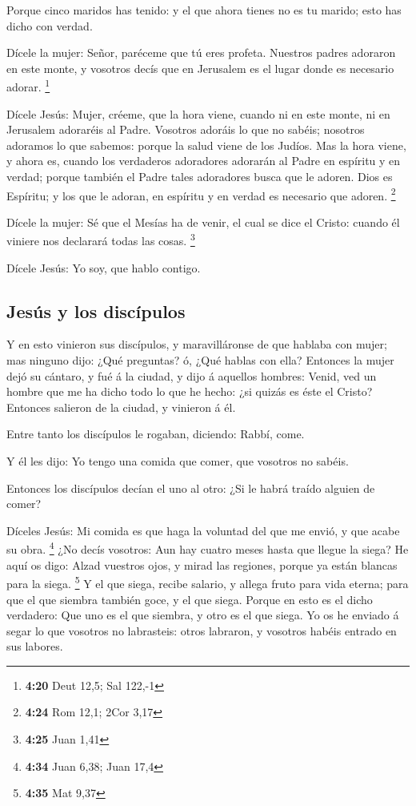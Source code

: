  Porque cinco maridos has tenido: y el que ahora tienes
no es tu marido; esto has dicho con verdad.

 Dícele la mujer: Señor, paréceme que tú eres profeta.
 Nuestros padres adoraron en este monte, y vosotros decís
que en Jerusalem es el lugar donde es necesario adorar. \footnote{\textbf{4:20}
  Deut 12,5; Sal 122,-1}

 Dícele Jesús: Mujer, créeme, que la hora viene, cuando
ni en este monte, ni en Jerusalem adoraréis al Padre. 
Vosotros adoráis lo que no sabéis; nosotros adoramos lo que sabemos:
porque la salud viene de los Judíos.  Mas la hora viene,
y ahora es, cuando los verdaderos adoradores adorarán al Padre en
espíritu y en verdad; porque también el Padre tales adoradores busca que
le adoren.  Dios es Espíritu; y los que le adoran, en
espíritu y en verdad es necesario que adoren. \footnote{\textbf{4:24}
  Rom 12,1; 2Cor 3,17}

 Dícele la mujer: Sé que el Mesías ha de venir, el cual
se dice el Cristo: cuando él viniere nos declarará todas las cosas.
\footnote{\textbf{4:25} Juan 1,41}

 Dícele Jesús: Yo soy, que hablo contigo.

\hypertarget{jesuxfas-y-los-discuxedpulos}{%
\subsection{Jesús y los discípulos}\label{jesuxfas-y-los-discuxedpulos}}

 Y en esto vinieron sus discípulos, y maravilláronse de
que hablaba con mujer; mas ninguno dijo: ¿Qué preguntas? ó, ¿Qué hablas
con ella?  Entonces la mujer dejó su cántaro, y fué á la
ciudad, y dijo á aquellos hombres:  Venid, ved un hombre
que me ha dicho todo lo que he hecho: ¿si quizás es éste el Cristo?
 Entonces salieron de la ciudad, y vinieron á él.

 Entre tanto los discípulos le rogaban, diciendo: Rabbí,
come.

 Y él les dijo: Yo tengo una comida que comer, que
vosotros no sabéis.

 Entonces los discípulos decían el uno al otro: ¿Si le
habrá traído alguien de comer?

 Díceles Jesús: Mi comida es que haga la voluntad del que
me envió, y que acabe su obra. \footnote{\textbf{4:34} Juan 6,38; Juan
  17,4}  ¿No decís vosotros: Aun hay cuatro meses hasta
que llegue la siega? He aquí os digo: Alzad vuestros ojos, y mirad las
regiones, porque ya están blancas para la siega. \footnote{\textbf{4:35}
  Mat 9,37}  Y el que siega, recibe salario, y allega
fruto para vida eterna; para que el que siembra también goce, y el que
siega.  Porque en esto es el dicho verdadero: Que uno es
el que siembra, y otro es el que siega.  Yo os he enviado
á segar lo que vosotros no labrasteis: otros labraron, y vosotros habéis
entrado en sus labores.

